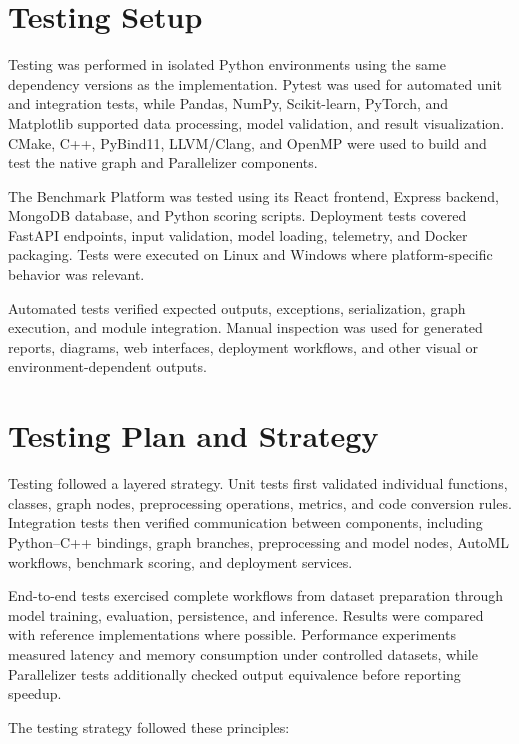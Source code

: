 \documentclass[12pt,a4paper]{report}
\begin{document}
\section{Testing Setup}
Testing was performed in isolated Python environments using the same dependency
versions as the implementation. Pytest was used for automated unit and
integration tests, while Pandas, NumPy, Scikit-learn, PyTorch, and Matplotlib
supported data processing, model validation, and result visualization.
CMake, C++, PyBind11, LLVM/Clang, and OpenMP were used to build and test the
native graph and Parallelizer components.

The Benchmark Platform was tested using its React frontend, Express backend,
MongoDB database, and Python scoring scripts. Deployment tests covered FastAPI
endpoints, input validation, model loading, telemetry, and Docker packaging.
Tests were executed on Linux and Windows where platform-specific behavior was
relevant.

Automated tests verified expected outputs, exceptions, serialization, graph
execution, and module integration. Manual inspection was used for generated
reports, diagrams, web interfaces, deployment workflows, and other visual or
environment-dependent outputs.

\section{Testing Plan and Strategy}

Testing followed a layered strategy. Unit tests first validated individual
functions, classes, graph nodes, preprocessing operations, metrics, and code
conversion rules. Integration tests then verified communication between
components, including Python--C++ bindings, graph branches, preprocessing and
model nodes, AutoML workflows, benchmark scoring, and deployment services.

End-to-end tests exercised complete workflows from dataset preparation through
model training, evaluation, persistence, and inference. Results were compared
with reference implementations where possible. Performance experiments measured
latency and memory consumption under controlled datasets, while Parallelizer
tests additionally checked output equivalence before reporting speedup.

The testing strategy followed these principles:
\end{document}
